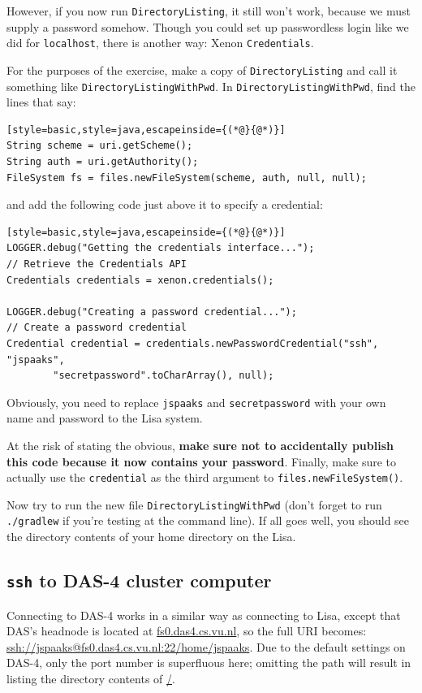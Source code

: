 \documentclass[12pt, a4paper, twoside, openany, titlepage]{book}
\begin{document}
However, if you now run \texttt{DirectoryListing}, it still won't work, because we must supply a password somehow. Though you could set up passwordless login like we did for \texttt{localhost}, there is another way: Xenon \texttt{Credentials}.

For the purposes of the exercise, make a copy of \texttt{DirectoryListing} and call it something like \texttt{DirectoryListingWithPwd}. In \texttt{DirectoryListingWithPwd}, find the lines that say:
\begin{lstlisting}[style=basic,style=java,escapeinside={(*@}{@*)}]
String scheme = uri.getScheme();
String auth = uri.getAuthority();
FileSystem fs = files.newFileSystem(scheme, auth, null, null);
\end{lstlisting}

and add the following code just above it to specify a credential:
\begin{lstlisting}[style=basic,style=java,escapeinside={(*@}{@*)}]
LOGGER.debug("Getting the credentials interface...");
// Retrieve the Credentials API
Credentials credentials = xenon.credentials();

LOGGER.debug("Creating a password credential...");
// Create a password credential
Credential credential = credentials.newPasswordCredential("ssh", "jspaaks",
        "secretpassword".toCharArray(), null);
\end{lstlisting}

Obviously, you need to replace \texttt{jspaaks} and \texttt{secretpassword} with your own name and password to the Lisa system.

At the risk of stating the obvious, \textbf{make sure not to accidentally publish this code because it now contains your password}. Finally, make sure to actually use the \texttt{credential} as the third argument to \texttt{files.newFileSystem()}.

Now try to run the new file \texttt{DirectoryListingWithPwd} (don't forget to run \texttt{./gradlew} if you're testing at the command line). If all goes well, you should see the directory contents of your home directory on the Lisa.


\subsection{\texttt{ssh} to DAS-4 cluster computer}

Connecting to DAS-4 works in a similar way as connecting to Lisa, except that DAS's headnode is located at \url{fs0.das4.cs.vu.nl}, so the full URI becomes:\\ \url{ssh://jspaaks@fs0.das4.cs.vu.nl:22/home/jspaaks}. Due to the default settings on DAS-4, only the port number is superfluous here; omitting the path will result in listing the directory contents of \url{/}.
\end{document}
